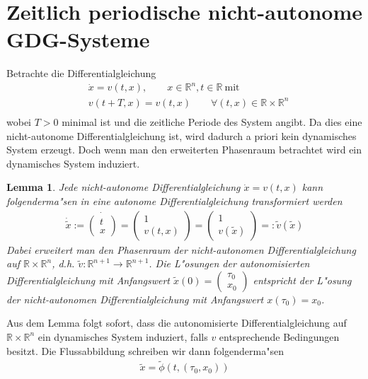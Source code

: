 \documentclass[a4paper, 13pt]{scrreprt}
\newtheorem{lemma}[theorem]{Lemma}
\theoremstyle{definition} \newtheorem{definition}{Definition}[section]
\newcommand{\RR}{\mathbb{R}}
\begin{document}
\section{Zeitlich periodische nicht-autonome GDG-Systeme}

Betrachte die Differentialgleichung
	\begin{align*} 
		&\dot{x} = v(t,x), \qquad x \in \mathbb{R}^n, t \in \mathbb{R}\ \text{mit} \\
		&v(t+T,x) = v(t,x)\qquad \forall (t,x) \in \mathbb{R}\times\mathbb{R}^n \\
	\end{align*}
wobei $T > 0$ minimal ist und die zeitliche Periode des System angibt. Da dies eine nicht-autonome Differentialgleichung ist, wird dadurch a priori kein dynamisches System erzeugt. Doch wenn man den erweiterten Phasenraum betrachtet wird ein dynamisches System induziert.
\begin{lemma}
Jede nicht-autonome Differentialgleichung $\dot x = v(t, x)$ kann folgenderma"sen in eine autonome Differentialgleichung 
transformiert werden
\begin{align*}
	\dot{\tilde x} := \dot{\begin{pmatrix}
		t\\
		x
	\end{pmatrix}} = 
	\begin{pmatrix}
		1\\
		v(t,x)
	\end{pmatrix} = 
	\begin{pmatrix}
		1\\
		v(\tilde x)
	\end{pmatrix}
	=: \tilde v(\tilde x)
\end{align*}
Dabei erweitert man den Phasenraum der nicht-autonomen Differentialgleichung auf $\RR \times \RR^n$, d.h. $\tilde v\colon \RR^{n+1} \to \RR^{n+1}$. Die L"osungen der autonomisierten Differentialgleichung mit Anfangswert $\tilde x (0) = \begin{pmatrix} \tau_0 \\ x_0 \end{pmatrix}$ entspricht der L"osung der nicht-autonomen Differentialgleichung mit Anfangswert $x(\tau_0) = x_0$.
\end{lemma}
Aus dem Lemma folgt sofort, dass die autonomisierte Differentialgleichung auf $\RR\times \RR^n$ ein dynamisches System induziert, falls $v$ entsprechende Bedingungen besitzt. Die Flussabbildung schreiben wir dann folgenderma"sen
\begin{align*} 
		\tilde x = \tilde\phi\left(t, \left(\tau_0, x_0\right) \right)
\end{align*}
\end{document}
